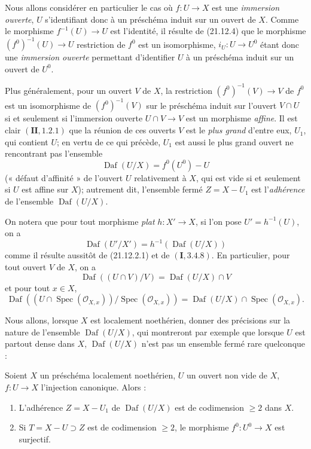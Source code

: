 \begin{env}[21.12.5]
\label{IV.21.12.5}
Nous allons considérer en particulier le cas où $f:U\to X$ est une \emph{immersion
ouverte}, $U$ s'identifiant donc à un préschéma induit sur un ouvert de $X$. Comme le
morphisme $f^{-1}(U)\to U$ est l'identité, il résulte de (21.12.4) que le morphisme
$(f^0)^{-1}(U)\to U$ restriction de $f^0$ est un isomorphisme, $i_U:U\to U^0$ étant
donc une \emph{immersion ouverte} permettant d'identifier $U$ à un préschéma induit
sur un ouvert de $U^0$.

Plus généralement, pour un ouvert $V$ de $X$, la restriction $(f^0)^{-1}(V)\to V$ de
$f^0$ est un isomorphisme de $(f^0)^{-1}(V)$ sur le préschéma induit sur l'ouvert
$V\cap U$ si et seulement si l'immersion ouverte $U\cap V\to V$ est un morphisme
\emph{affine}. Il est clair $(\mathbf{II}, 1.2.1)$
que la réunion de ces ouverts $V$ est le \emph{plus grand} d'entre eux, $U_1$, qui
contient $U$; en vertu de ce qui précède, $U_1$ est aussi le plus grand ouvert ne
rencontrant pas l'ensemble
\[
  \operatorname{Daf}(U/X)=f^0(U^0)-U
\]
(« défaut d'affinité » de l'ouvert $U$ relativement à $X$, qui est vide si et seulement
si $U$ est affine sur $X$); autrement dit, l'ensemble fermé $Z=X-U_1$ est
l'\emph{adhérence} de l'ensemble $\operatorname{Daf}(U/X)$.

On notera que pour tout morphisme \emph{plat} $h:X'\to X$, si l'on pose
$U'=h^{-1}(U)$, on a
\[
\label{IV.21.12.5.1}
  \operatorname{Daf}(U'/X')=h^{-1}(\operatorname{Daf}(U/X))
  \tag{21.12.5.1}
\]
comme il résulte aussitôt de (21.12.2.1) et de $(\mathbf I, 3.4.8)$. En particulier,
pour tout ouvert $V$ de $X$, on a
\[
\label{IV.21.12.5.2}
  \operatorname{Daf}((U\cap V)/V)=\operatorname{Daf}(U/X)\cap V
  \tag{21.12.5.2}
\]
et pour tout $x\in X$,
\[
\label{IV.21.12.5.3}
  \operatorname{Daf}((U\cap\operatorname{Spec}(\mathcal O_{X,x}))
  /\operatorname{Spec}(\mathcal O_{X,x}))
  =\operatorname{Daf}(U/X)\cap\operatorname{Spec}(\mathcal O_{X,x}).
  \tag{21.12.5.3}
\]
\end{env}

Nous allons, lorsque $X$ est localement noethérien, donner des précisions sur la nature
de l'ensemble $\operatorname{Daf}(U/X)$, qui montreront par exemple que lorsque $U$ est
partout dense dans $X$, $\operatorname{Daf}(U/X)$ n'est pas un ensemble fermé rare
quelconque :

\begin{theorem}[21.12.6]
\label{IV.21.12.6}
Soient $X$ un préschéma localement noethérien, $U$ un ouvert non vide de $X$,
$f:U\to X$ l'injection canonique. Alors :
\begin{enumerate}[label=(\roman*)]
  \item L'adhérence $Z=X-U_1$ de $\operatorname{Daf}(U/X)$ est de codimension
  $\geq2$ dans $X$.
  \item Si $T=X-U\supset Z$ est de codimension $\geq2$, le morphisme
  $f^0:U^0\to X$ est surjectif.
\end{enumerate}
\end{theorem}

